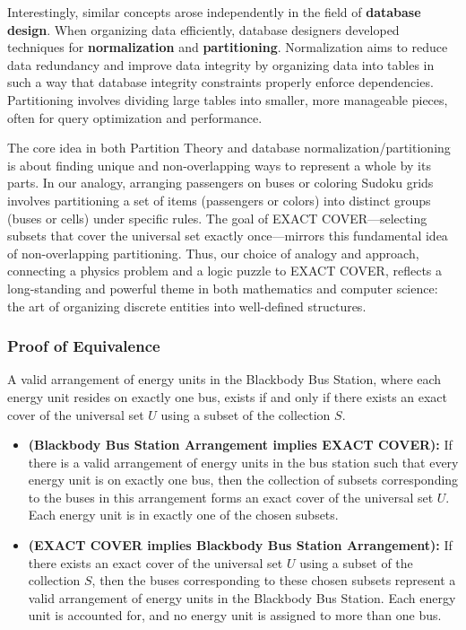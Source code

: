 \documentclass{report}
\begin{document}
Interestingly, similar concepts arose independently in the field of \textbf{database design}. When organizing data efficiently, database designers developed techniques for \textbf{normalization} and \textbf{partitioning}. Normalization aims to reduce data redundancy and improve data integrity by organizing data into tables in such a way that database integrity constraints properly enforce dependencies. Partitioning involves dividing large tables into smaller, more manageable pieces, often for query optimization and performance.

The core idea in both Partition Theory and database normalization/partitioning is about finding unique and non-overlapping ways to represent a whole by its parts. In our analogy, arranging passengers on buses or coloring Sudoku grids involves partitioning a set of items (passengers or colors) into distinct groups (buses or cells) under specific rules. The goal of EXACT COVER—selecting subsets that cover the universal set exactly once—mirrors this fundamental idea of non-overlapping partitioning. Thus, our choice of analogy and approach, connecting a physics problem and a logic puzzle to EXACT COVER, reflects a long-standing and powerful theme in both mathematics and computer science: the art of organizing discrete entities into well-defined structures.

\subsubsection*{Proof of Equivalence}

A valid arrangement of energy units in the Blackbody Bus Station, where each energy unit resides on exactly one bus, exists if and only if there exists an exact cover of the universal set \(U\) using a subset of the collection \(S\).

\begin{itemize}
    \item \textbf{(Blackbody Bus Station Arrangement implies EXACT COVER):} If there is a valid arrangement of energy units in the bus station such that every energy unit is on exactly one bus, then the collection of subsets corresponding to the buses in this arrangement forms an exact cover of the universal set \(U\). Each energy unit is in exactly one of the chosen subsets.

    \item \textbf{(EXACT COVER implies Blackbody Bus Station Arrangement):} If there exists an exact cover of the universal set \(U\) using a subset of the collection \(S\), then the buses corresponding to these chosen subsets represent a valid arrangement of energy units in the Blackbody Bus Station. Each energy unit is accounted for, and no energy unit is assigned to more than one bus.
\end{itemize}
\end{document}
